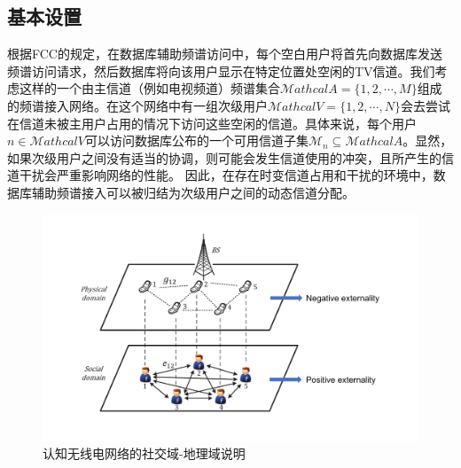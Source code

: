 \subsection{基本设置}\label{sec:system-model}
根据FCC\cite{FCCApril52012}的规定，在数据库辅助频谱访问中，每个空白用户将首先向数据库发送频谱访问请求，然后数据库将向该用户显示在特定位置处空闲的TV信道。我们考虑这样的一个由主信道（例如电视频道）频谱集合$\mathcal{M}athcal{A}=\{1,2,\cdots,M\}$组成的频谱接入网络。在这个网络中有一组次级用户$\mathcal{M}athcal{V}=\{1,2,\cdots,N\}$会去尝试在信道未被主用户占用的情况下访问这些空闲的信道。具体来说，每个用户$n\in\mathcal{M}athcal{V}$可以访问数据库公布的一个可用信道子集$\mathcal{M}_n\subseteq\mathcal{M}athcal{A}$。显然，如果次级用户之间没有适当的协调，则可能会发生信道使用的冲突，且所产生的信道干扰会严重影响网络的性能。 {\kaishu 因此，在存在时变信道占用和干扰的环境中，数据库辅助频谱接入可以被归结为次级用户之间的动态信道分配。}
\begin{figure}[!t]
\centering
\includegraphics[scale=0.64]{./pic/sysfig11.pdf}
\caption{认知无线电网络的社交域-地理域说明}\label{fg:domain}
\end{figure}

